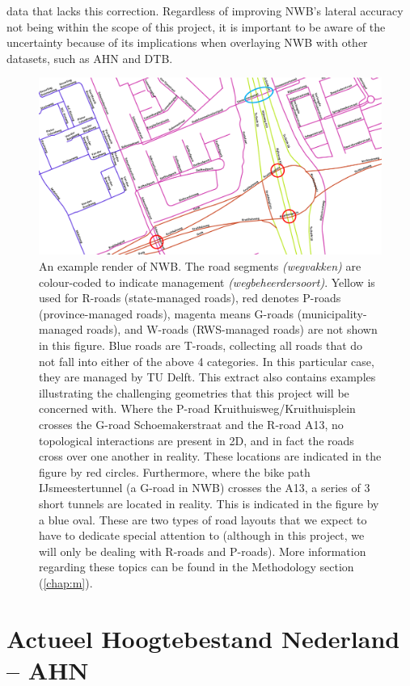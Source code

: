 data that lacks this correction. Regardless of improving NWB’s lateral accuracy not being within the scope of this project, it is important to be aware of the uncertainty because of its implications when overlaying NWB with other datasets, such as AHN and DTB.

\begin{figure}
    \centering
    \includegraphics[width=\linewidth]{p2/figs/nwb_sample_02.png} 
    \caption{An example render of NWB. The road segments \textit{(wegvakken)} are colour-coded to indicate management \textit{(wegbeheerdersoort)}. Yellow is used for R-roads (state-managed roads), red denotes P-roads (province-managed roads), magenta means G-roads (municipality-managed roads), and W-roads (RWS-managed roads) are not shown in this figure. Blue roads are T-roads, collecting all roads that do not fall into either of the above 4 categories. In this particular case, they are managed by TU Delft. This extract also contains examples illustrating the challenging geometries that this project will be concerned with. Where the P-road Kruithuisweg/Kruithuisplein crosses the G-road Schoemakerstraat and the R-road A13, no topological interactions are present in 2D, and in fact the roads cross over one another in reality. These locations are indicated in the figure by red circles. Furthermore, where the bike path IJsmeestertunnel (a G-road in NWB) crosses the A13, a series of 3 short tunnels are located in reality. This is indicated in the figure by a blue oval. These are two types of road layouts that we expect to have to dedicate special attention to (although in this project, we will only be dealing with R-roads and P-roads). More information regarding these topics can be found in the Methodology section (\ref{chap:m}).}
    \label{fig:nwb}
\end{figure}

\section*{Actueel Hoogtebestand Nederland – AHN}

